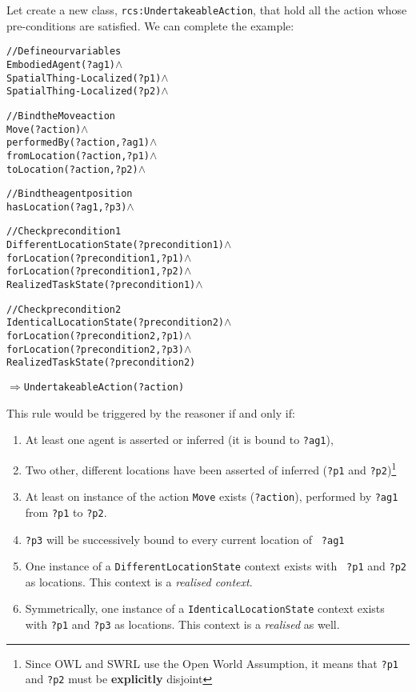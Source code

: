 Let create a new class, {\tt rcs:UndertakeableAction}, that hold all the action
whose pre-conditions are satisfied. We can complete the example:



\begin{alltt}

//Define our variables
EmbodiedAgent(?ag1) \(\land\)
SpatialThing-Localized(?p1) \(\land\)
SpatialThing-Localized(?p2) \(\land\)

//Bind the Move action
Move(?action) \(\land\)
performedBy(?action, ?ag1) \(\land\)
fromLocation(?action, ?p1) \(\land\)
toLocation(?action, ?p2) \(\land\)

//Bind the agent position
hasLocation(?ag1, ?p3) \(\land\)

//Check precondition 1
DifferentLocationState(?precondition1) \(\land\)
forLocation(?precondition1, ?p1) \(\land\)
forLocation(?precondition1, ?p2) \(\land\)
RealizedTaskState(?precondition1) \(\land\)

//Check precondition 2
IdenticalLocationState(?precondition2) \(\land\)
forLocation(?precondition2, ?p1) \(\land\)
forLocation(?precondition2, ?p3) \(\land\)
RealizedTaskState(?precondition2)

\(\Rightarrow\) UndertakeableAction(?action)

\end{alltt}

This rule would be triggered by the reasoner if and only if:


\begin{enumerate}

\item  At least one agent is asserted or inferred (it is bound to {\tt ?ag1}),

\item  Two other, different locations have been asserted of inferred ({\tt ?p1}
and {\tt ?p2})\footnote{Since OWL and SWRL use the Open World Assumption, it
means that {\tt ?p1} and {\tt ?p2} must be {\bf explicitly} disjoint}

\item  At least on instance of the action {\tt Move} exists ({\tt ?action}),
performed by {\tt ?ag1} from {\tt ?p1} to {\tt ?p2}.

\item  {\tt ?p3} will be successively bound to every current location of {\tt
?ag1}

\item  One instance of a {\tt DifferentLocationState} context exists with {\tt
?p1} and {\tt ?p2} as locations. This context is a \emph{realised context}.

\item  Symmetrically, one instance of a {\tt IdenticalLocationState} context
exists with {\tt ?p1} and {\tt ?p3} as locations. This context is a
\emph{realised} as well.

\end{enumerate}

